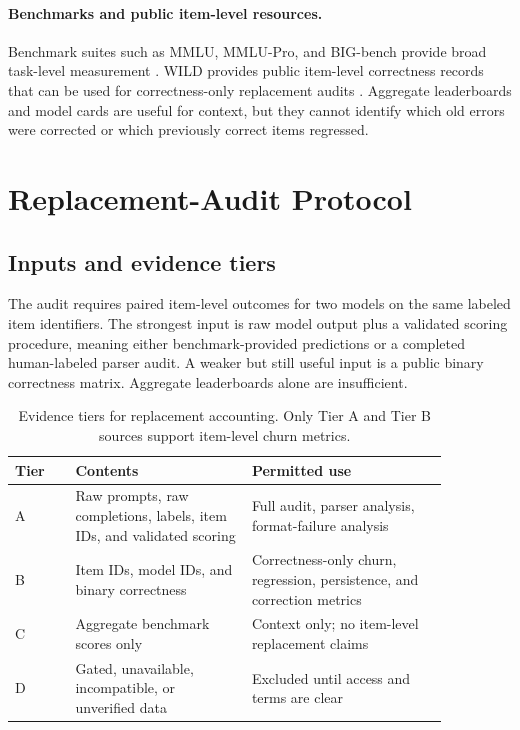\documentclass[manuscript, screen, review, nonacm]{jair}
\begin{document}
\paragraph{Benchmarks and public item-level resources.}
Benchmark suites such as MMLU, MMLU-Pro, and BIG-bench provide broad task-level measurement \parencite{hendrycks2021mmlu,wang2024mmlupro,srivastava2022bigbench}. WILD provides public item-level correctness records that can be used for correctness-only replacement audits \parencite{krumdick2026wild}. Aggregate leaderboards and model cards are useful for context, but they cannot identify which old errors were corrected or which previously correct items regressed.

\section{Replacement-Audit Protocol}

\subsection{Inputs and evidence tiers}

The audit requires paired item-level outcomes for two models on the same labeled item identifiers. The strongest input is raw model output plus a validated scoring procedure, meaning either benchmark-provided predictions or a completed human-labeled parser audit. A weaker but still useful input is a public binary correctness matrix. Aggregate leaderboards alone are insufficient.

\begin{table}[t]
\centering
\small
\begin{tabular}{p{0.12\linewidth}p{0.35\linewidth}p{0.39\linewidth}}
\toprule
Tier & Contents & Permitted use \\
\midrule
A & Raw prompts, raw completions, labels, item IDs, and validated scoring & Full audit, parser analysis, format-failure analysis \\
B & Item IDs, model IDs, and binary correctness & Correctness-only churn, regression, persistence, and correction metrics \\
C & Aggregate benchmark scores only & Context only; no item-level replacement claims \\
D & Gated, unavailable, incompatible, or unverified data & Excluded until access and terms are clear \\
\bottomrule
\end{tabular}
\caption{Evidence tiers for replacement accounting. Only Tier A and Tier B sources support item-level churn metrics.}
\label{tab:evidence-tiers}
\end{table}
\end{document}
